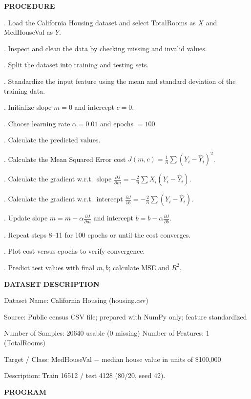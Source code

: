 \documentclass[11pt,twoside]{article}
\newcommand{\expheading}[1]{{\fontsize{14}{17}\selectfont\textbf{#1}\par}}
\newcommand{\toevenpage}{\clearpage\ifodd\value{page}\null\thispagestyle{empty}\newpage\fi}
\begin{document}
{\expheading{PROCEDURE}
\vspace{4pt}
. Load the California Housing dataset and select TotalRooms as $X$ and MedHouseVal as $Y$.\par
{}. Inspect and clean the data by checking missing and invalid values.\par
{}. Split the dataset into training and testing sets.\par
{}. Standardize the input feature using the mean and standard deviation of the training data.\par
{}. Initialize slope $m=0$ and intercept $c=0$.\par
{}. Choose learning rate $\alpha=0.01$ and epochs $=100$.\par
{}. Calculate the predicted values.\par
{}. Calculate the Mean Squared Error cost $J(m,c)=\frac{1}{n}\sum(Y_i-\hat{Y}_i)^2$.\par
{}. Calculate the gradient w.r.t.\ slope $\frac{\partial J}{\partial m}=-\frac{2}{n}\sum X_i(Y_i-\hat{Y}_i)$.\par
{}. Calculate the gradient w.r.t.\ intercept $\frac{\partial J}{\partial b}=-\frac{2}{n}\sum(Y_i-\hat{Y}_i)$.\par
{}. Update slope $m=m-\alpha\frac{\partial J}{\partial m}$ and intercept $b=b-\alpha\frac{\partial J}{\partial b}$.\par
{}. Repeat steps 8--11 for 100 epochs or until the cost converges.\par
{}. Plot cost versus epochs to verify convergence.\par
{}. Predict test values with final $m,b$; calculate MSE and $R^2$. \par
\vspace{4pt}

\expheading{DATASET DESCRIPTION}
\vspace{4pt}
\noindent Dataset Name: California Housing (housing.csv)\par
\noindent Source: Public census CSV file; prepared with NumPy only; feature standardized\par
\noindent Number of Samples: 20640 usable (0 missing) \hspace{0.3cm} Number of Features: 1 (TotalRooms)\par
\noindent Target / Class: MedHouseVal $-$ median house value in units of \$100{,}000\par
\noindent Description: Train 16512 / test 4128 (80/20, seed 42). \par
\vspace{4pt}
} %
\toevenpage
\expheading{PROGRAM}
\vspace{6pt}
\end{document}
